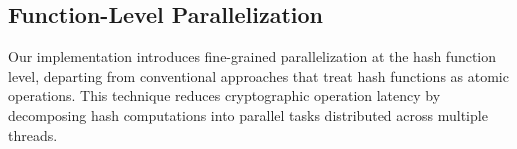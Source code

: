 \documentclass[journal]{IEEEtran}
\begin{document}
\subsection{Function-Level Parallelization}

Our implementation introduces fine-grained parallelization at the hash function level, departing from conventional approaches that treat hash functions as atomic operations. This technique reduces cryptographic operation latency by decomposing hash computations into parallel tasks distributed across multiple threads.








\end{document}
